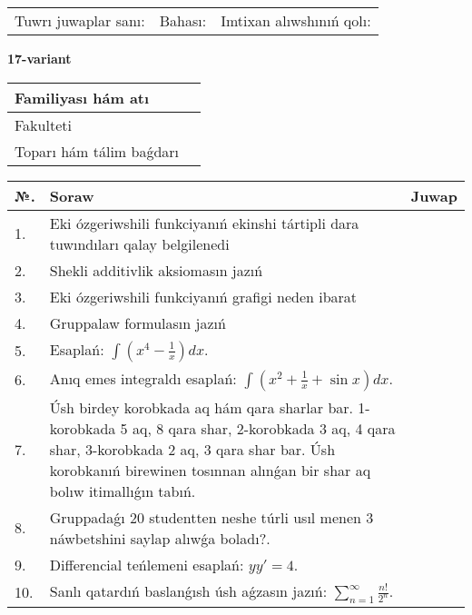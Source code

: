 \documentclass{article}
\begin{document}
\vspace{1cm}

\begin{tabular}{ c c c }
Tuwrı juwaplar sanı: \underline{\hspace{2cm}} & Bahası: \underline{\hspace{2cm}} & Imtixan alıwshınıń qolı: \underline{\hspace{2cm}} \\
\end{tabular}

\newpage

\begin{center}\textbf{17-variant}\end{center}

\bgroup
\def\arraystretch{1.5}
\begin{tabular}{ |m{6cm}|m{10cm}| }
  \hline
  Familiyası hám atı & \\
  \hline
  Fakulteti &\\
  \hline
  Toparı hám tálim baǵdarı & \\
  \hline
\end{tabular}
\egroup

\vspace{0.5cm}

\bgroup
\def\arraystretch{2}
\begin{tabular}{ |l|m{8cm}|m{7cm}| }
  \hline
  №. & Soraw & Juwap \\
  \hline
  1. & Eki ózgeriwshili funkciyanıń ekinshi tártipli dara tuwındıları qalay belgilenedi &  \\
  \hline
  2. & Shekli additivlik aksiomasın jazıń &  \\
  \hline
  3. & Eki ózgeriwshili funkciyanıń grafigi neden ibarat &  \\
  \hline
  4. & Gruppalaw formulasın jazıń &  \\
  \hline
  5. & Esaplań: $\displaystyle\int \left( x^{4}-\frac{1}{x} \right)dx$. &  \\
  \hline
  6. & Anıq emes integraldı esaplań: $\displaystyle\int(x^{2}+\frac{1}{x} + \sin x)dx$. &  \\
  \hline
  7. & Úsh birdey korobkada aq hám qara sharlar bar. 1-korobkada 5 aq, 8 qara shar, 2-korobkada 3 aq, 4 qara shar, 3-korobkada 2 aq, 3 qara shar bar. Úsh korobkanıń birewinen tosınnan alınǵan bir shar aq bolıw itimallıǵın tabıń. &  \\
  \hline
  8. & Gruppadaǵı 20 studentten neshe túrli usıl menen 3 náwbetshini saylap alıwǵa boladı?. &  \\
  \hline
  9. & Differencial teńlemeni esaplań: $yy'= 4$. &  \\
  \hline
  10. & Sanlı qatardıń baslanǵısh úsh aǵzasın jazıń: $\displaystyle\sum_{n = 1}^{\infty}\frac{n!}{2^{n}}$. &  \\
  \hline
\end{tabular}
\egroup
\end{document}
